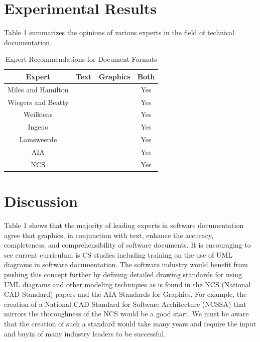 \documentclass{acm_proc_article-sp}
\begin{document}
\section{Experimental Results}
Table 1 summarizes the opinions of various experts in the field of technical documentation.
\begin{table}[ht]
	\caption{Expert Recommendations for Document Formats} %
	\centering %
	\begin{tabular}{c c c c} %
		\hline\hline %
		Expert & Text & Graphics & Both \\ [0.5ex] %
		\hline %
		Miles and Hamilton \cite{Lamport:UML} &  &  & Yes \\ %
		Wiegers and Beatty \cite{Lamport:SoftwareRequirements} &  &  & Yes \\
		Weilkiens \cite{Lamport:SysML} &  &  & Yes \\
		Ingeno \cite{Lamport:SoftwareArchitectureHandbook} &  &  & Yes \\
		Lamsweerde \cite{Lamport:RequirementsEngineering} &  &  & Yes \\
		AIA \cite{Lamport:AIA_Graphical_Standards} &  &  & Yes \\
		NCS \cite{NCS} &  &  & Yes \\ [1ex] %
		\hline %
	\end{tabular}
	\label{table:nonlin} %
\end{table}

\section{Discussion}
Table 1 shows that the majority of leading experts in software documentation agree that graphics, in conjunction with text, enhance the accuracy, completeness, and comprehensibility of software documents. It is encouraging to see current curriculum is CS studies including training on the use of UML diagrams in software documentation. The software industry would benefit from pushing this concept further by defining detailed drawing standards for using UML diagrams and other modeling techniques as is found in the NCS (National CAD Standard) papers and the AIA Standards for Graphics. For example, the creation of a National CAD Standard for Software Architecture (NCSSA) that mirrors the thoroughness of the NCS would be a good start. We must be aware that the creation of such a standard would take many years and require the input and buyin of many industry leaders to be successful.
\end{document}
